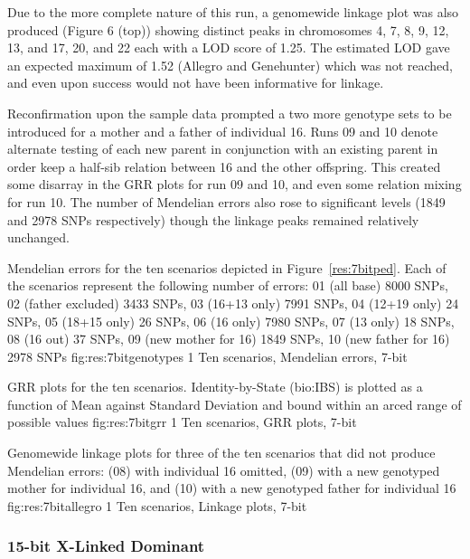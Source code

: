 Due to the more complete nature of this run, a genomewide linkage plot was also produced (Figure 6 (top)) showing distinct peaks in chromosomes 4, 7, 8, 9, 12, 13, and 17, 20, and 22 each with a LOD score of 1.25. The estimated LOD gave an expected maximum of 1.52 (Allegro and Genehunter) which was not reached, and even upon success would not have been informative for linkage.

Reconfirmation upon the sample data prompted a two more genotype sets to be introduced for a mother and a father of individual 16. Runs 09 and 10 denote alternate testing of each new parent in conjunction with an existing parent in order keep a half-sib relation between 16 and the other offspring.
This created some disarray in the GRR plots for run 09 and 10, and even some relation mixing for run 10. The number of Mendelian errors also rose to significant levels (1849 and 2978 SNPs respectively) though the linkage peaks remained relatively unchanged.

{Mendelian errors for the ten scenarios depicted in Figure~\ref{res:7bitped}. Each of the scenarios represent the following number of errors: 01 (all base) 8000 SNPs, 02 (father excluded) 3433 SNPs, 03 (16+13 only) 7991 SNPs, 04 (12+19 only) 24 SNPs, 05 (18+15 only) 26 SNPs, 06 (16 only) 7980 SNPs, 07 (13 only) 18 SNPs, 08 (16 out) 37 SNPs, 09 (new mother for 16) 1849 SNPs, 10 (new father for 16) 2978 SNPs}
{fig:res:7bitgenotypes}
{1}
{Ten scenarios, Mendelian errors, 7-bit}

{GRR plots for the ten scenarios. Identity-by-State (\gls{bio:IBS}) is plotted as a function of Mean against Standard Deviation and bound within an arced range of possible values}
{fig:res:7bitgrr}
{1}
{Ten scenarios, GRR plots, 7-bit}

{Genomewide linkage plots for three of the ten scenarios that did not produce Mendelian errors: (08) with individual 16 omitted, (09) with a new genotyped mother for individual 16, and (10) with a new genotyped father for individual 16}
{fig:res:7bitallegro}
{1}
{Ten scenarios, Linkage plots, 7-bit}


\subsubsection*{15-bit X-Linked Dominant}


